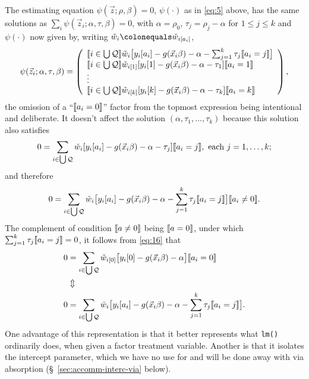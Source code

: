 \documentclass{article}
\newcommand{\defeq}{\ensuremath{\colonequals}}
\DeclarePairedDelimiter{\indicator}{\llbracket}{\rrbracket}
\newcommand{\owt}[1][{[a_i]}]{\ensuremath{\check{w}_{i#1}}}
\begin{document}
The estimating equation $\psi(\vec{z}; \rho, \beta)=0$,
$\psi(\cdot)$ as in \eqref{eq:5} above, has the same solutions as $\sum_{i}\psi(\vec{z}_{i};
  \alpha, \tau, \beta)=0$, with $\alpha=\rho_{0}$, $\tau_{j}=\rho_{j}-\alpha$ for
$1\leq j \leq k$ and $\psi(\cdot)$ now given by, writing $\owt[] \defeq \owt{}$, 
\begin{equation} \label{eq:14}
         \psi(\vec{z}_{i};
  \alpha, \tau, \beta) =
         \left( \begin{array}{l}
           \indicator{i \in \bigcup \mathcal{Q}}\owt[] \big[y_{i}[a_{i}] - g(\vec{x}_{i}\beta)-
                  \alpha - \sum_{j=1}^{k}\tau_{j}\indicator{a_{i}=j}\big]\\
           \indicator{i \in \bigcup \mathcal{Q}}\owt[{[1]}] [y_{i}[1] - g(\vec{x}_{i}\beta)-
                  \alpha-\tau_{1}]\indicator{a_{i}=1}\\
                  \vdots \\
           \indicator{i \in \bigcup \mathcal{Q}}\owt[{[k]}] [y_{i}[k] - g(\vec{x}_{i}\beta)-
                 \alpha - \tau_{k}]\indicator{a_{i}=k}\\
                \end{array}\right), 
\end{equation}
the omission of a ``$\indicator{a_{i}=0}$'' factor from the topmost
expression being intentional and deliberate. It doesn't affect the solution
$(\alpha, \tau_{1}, \ldots, \tau_{k})$ because this solution also satisfies
\begin{equation} \label{eq:16}
       0 = \sum_{i \in \bigcup \mathcal{Q}}\owt[][y_{i}[a_i] - g(\vec{x}_{i}\beta)-
                  \alpha-\tau_{j}]\indicator{a_{i}=j}, \text{ each } j=1, \ldots, k;
\end{equation}
and therefore
\begin{equation*}
       0 = \sum_{i \in \bigcup \mathcal{Q}}\owt[]\big[y_{i}[a_i] - g(\vec{x}_{i}\beta)-
                  \alpha-\sum_{j=1}^{k}\tau_{j}\indicator{a_{i}=j}\big]\indicator{a_{i}
                  \neq 0}.
\end{equation*}
The complement of condition $\indicator{a\neq 0}$ being
$\indicator{a=0}$, under which
$\sum_{j=1}^{k}\tau_{j}\indicator{a_{i}=j}=0$, it follows from \eqref{eq:16} that
\begin{align*}
         0 &= \sum_{i \in \bigcup \mathcal{Q}}\owt[{[0]}]\big[y_{i}[0] - g(\vec{x}_{i}\beta)-
                  \alpha\big]\indicator{a_{i}
             =0}\\
           & \Updownarrow \\
         0 &= \sum_{i \in \bigcup \mathcal{Q}}\owt[]\big[y_{i}[a_i] - g(\vec{x}_{i}\beta)-
                  \alpha - \sum_{j=1}^{k}\tau_{j}\indicator{a_{i}=j}\big].
\end{align*}
One advantage of this representation is that it better represents what
\texttt{lm()} ordinarily does, when given a factor treatment
variable.  Another is that it isolates the intercept parameter, which
we have no use for and will be done away with via absorption (\S~\ref{sec:accomm-interc-via} below). 
\end{document}
